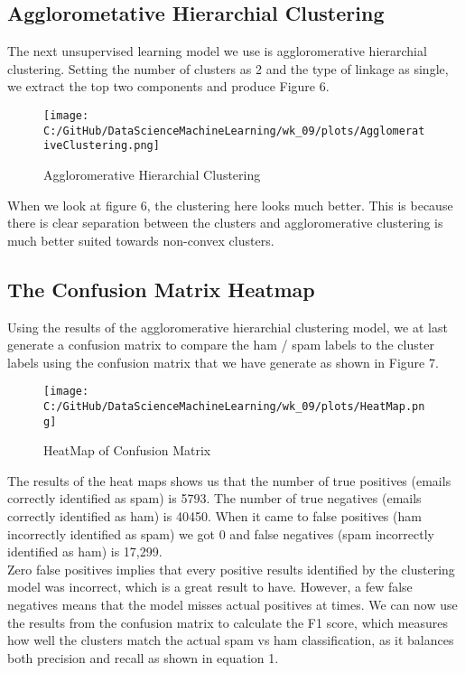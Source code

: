 \documentclass[a4paper, twocolumn]{article}
\begin{document}
\subsection{Agglorometative Hierarchial Clustering}
The next unsupervised learning model we use is aggloromerative hierarchial clustering. Setting the number of clusters as 2 and the type of linkage as single,
we extract the top two components and produce Figure 6.

\begin{figure}[H]
    \centering
    \texttt{[image: C:/GitHub/DataScienceMachineLearning/wk\_09/plots/AgglomerativeClustering.png]}
    \caption{Aggloromerative Hierarchial Clustering}
\end{figure}

\vspace{1em}

\noindent When we look at figure 6, the clustering here looks much better. This is because there is clear separation between the clusters and aggloromerative
clustering is much better suited towards non-convex clusters. 

\subsection{The Confusion Matrix Heatmap}
Using the results of the aggloromerative hierarchial clustering model, we at last generate a confusion matrix to compare the ham / spam labels to the cluster
labels using the confusion matrix that we have generate as shown in Figure 7.

\begin{figure}[H]
    \centering
    \texttt{[image: C:/GitHub/DataScienceMachineLearning/wk\_09/plots/HeatMap.png]}
    \caption{HeatMap of Confusion Matrix}
\end{figure}

\newpage

\noindent The results of the heat maps shows us that the number of true positives (emails correctly identified as spam) is 5793. The number of true negatives
(emails correctly identified as ham) is 40450. When it came to false positives (ham incorrectly identified as spam) we got 0 and false negatives (spam 
incorrectly identified as ham) is 17,299. \\

\noindent Zero false positives implies that every positive results identified by the clustering model was incorrect, which is a great result to have. However, 
a few false negatives means that the model misses actual positives at times. We can now use the results from the confusion matrix to calculate the F1 score,
which measures how well the clusters match the actual spam vs ham classification, as it balances both precision and recall as shown in equation 1.
\end{document}
